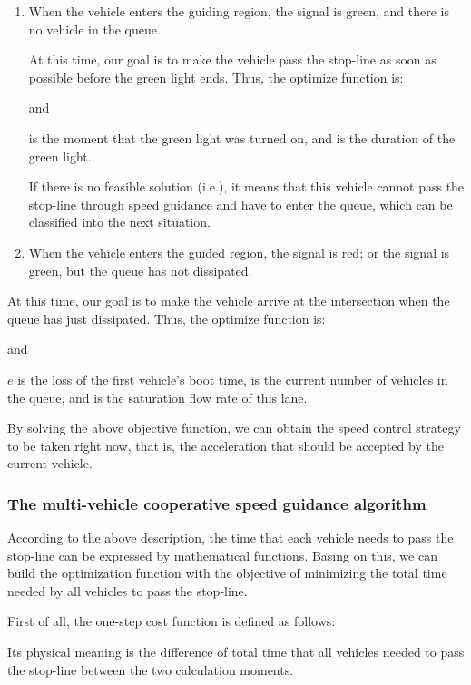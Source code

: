 \documentclass[10.5pt,compsoc]{TsT}
\theoremstyle{mystyle}
\renewcommand{\labelenumi}{(\arabic{enumi})}
\begin{document}
{\begin{enumerate}
\def\labelenumi{\alph{enumi})}
\item
  When the vehicle enters the guiding region, the signal is green, and
  there is no vehicle in the queue.

At this time, our goal is to make the vehicle pass the stop-line as soon
as possible before the green light ends. Thus, the optimize function is:

and

is the moment that the green light was turned on, and is the duration of
the green light.

If there is no feasible solution (i.e.), it means that this vehicle
cannot pass the stop-line through speed guidance and have to enter the
queue, which can be classified into the next situation.
\item
  When the vehicle enters the guided region, the signal is red; or the
  signal is green, but the queue has not dissipated.
\end{enumerate}

At this time, our goal is to make the vehicle arrive at the intersection
when the queue has just dissipated. Thus, the optimize function is:

and

$e$ is the loss of the first vehicle's boot time, is the current number of
vehicles in the queue, and is the saturation flow rate of this lane.

By solving the above objective function, we can obtain the speed control
strategy to be taken right now, that is, the acceleration that should be
accepted by the current vehicle.


\subsubsection{The multi-vehicle cooperative speed guidance algorithm}

According to the above description, the time that each vehicle needs to
pass the stop-line can be expressed by mathematical functions. Basing on
this, we can build the optimization function with the objective of
minimizing the total time needed by all vehicles to pass the stop-line.

First of all, the one-step cost function is defined as follows:

Its physical meaning is the difference of total time that all vehicles
needed to pass the stop-line between the two calculation moments.

}
\end{document}
